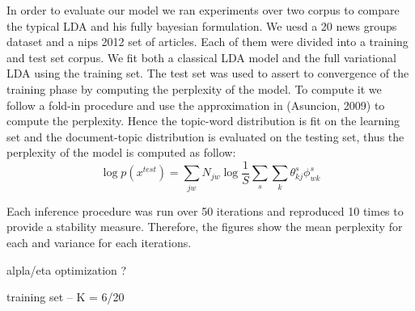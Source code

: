 
In order to evaluate our model we ran experiments over two corpus to compare the typical LDA and his fully bayesian formulation. We uesd a 20 news groups dataset and a nips 2012 set of articles. Each of them were divided into a training and test set corpus. We fit both a classical LDA model and the full variational LDA using the training set. The test set was used to assert to convergence of the training phase by computing the perplexity of the model. To compute it we follow a fold-in procedure and  use the approximation in (Asuncion, 2009) to compute the perplexity. Hence the topic-word distribution is fit on the learning set and the document-topic distribution is evaluated on the testing set, thus the perplexity of the model is computed as follow: 
\[ \log p(x^{test}) = \sum_{jw} N_{jw} \log \frac{1}{S} \sum_s \sum_k \theta^s_{kj} \phi^s_{wk} \]

Each inference procedure was run over 50 iterations and reproduced 10 times to provide a stability measure. Therefore, the figures show the mean perplexity for each and variance for each iterations.


alpla/eta optimization ?

training set -- K = 6/20
